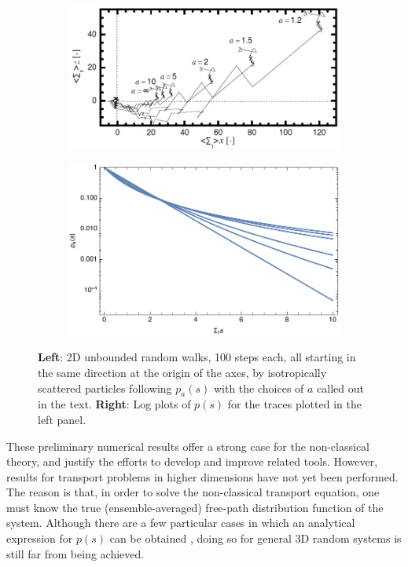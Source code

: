 \documentclass[12pt]{article}
\begin{document}
\begin{figure}[hbt]
    \centering
    \begin{subfigure}{0.49\textwidth}
        \centering
        \includegraphics[width=\textwidth]{fig4a.jpg}
    \end{subfigure}
        \begin{subfigure}{0.49\textwidth}
        \centering
        \includegraphics[width=\textwidth]{fig4b}
    \end{subfigure}
    \caption{\textbf{Left}: 2D unbounded random walks, 100 steps each, all starting in the same direction at the origin of the axes, by isotropically scattered particles following $p_a(s)$ with the choices of $a$ called out in the text. \textbf{Right}: Log plots of $p(s)$ for the traces plotted in the left panel.}\label{fig4}
\end{figure}

These preliminary numerical results offer a strong case for the non-classical theory, and justify the efforts to develop and improve related tools.
However, results for transport problems in higher dimensions have not yet been performed. The reason is that, in order to solve the non-classical transport equation, one must know the true (ensemble-averaged) free-path distribution function of the system.
Although there are a few particular cases in which an analytical expression for $p(s)$ can be obtained \cite{vaskry16,vassla16}, doing so for general 3D random systems is still far from being achieved.
\end{document}
